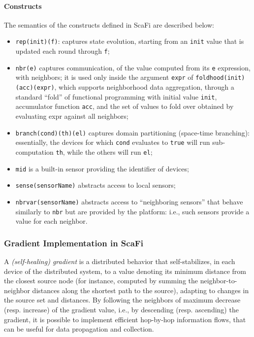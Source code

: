\paragraph{Constructs}
The semantics of the constructs defined in ScaFi are described below:
\begin{itemize}
    \item \texttt{rep(init)(f)}: captures state evolution, starting from an \texttt{init} value that is updated each round through \texttt{f};
    \item \texttt{nbr(e)} captures communication, of the value computed from its \texttt{e} expression, with neighbors; it is used only inside the argument \texttt{expr} of \texttt{foldhood(init)(acc)(expr)}, which supports neighborhood data aggregation, through a standard “fold” of functional programming with initial value \texttt{init}, accumulator function \texttt{acc}, and the set of values to fold over obtained by evaluating expr against all neighbors;
    \item \texttt{branch(cond)(th)(el)} captures domain partitioning (space-time branching): essentially, the devices for which \texttt{cond} evaluates to \texttt{true} will run sub-computation \texttt{th}, while the others will run \texttt{el};
    \item \texttt{mid} is a built-in sensor providing the identifier of devices;
    \item \texttt{sense(sensorName)} abstracts access to local sensors;
    \item \texttt{nbrvar(sensorName)} abstracts access to “neighboring sensors” that behave similarly to \texttt{nbr} but are provided by the platform: i.e., such sensors provide a value for each neighbor.
\end{itemize}

\subsubsection{Gradient Implementation in ScaFi}

A \textit{(self-healing) gradient} is a distributed behavior that self-stabilizes, in each device of the distributed system, to a value denoting its minimum distance from the closest source node (for instance, computed by summing the neighbor-to-neighbor distances along the shortest path to the source), adapting to changes in the source set and distances. By following the neighbors of maximum decrease (resp. increase) of the gradient value, i.e., by descending (resp. ascending) the gradient, it is possible to implement efficient hop-by-hop information flows, that can be useful for data propagation and collection.

